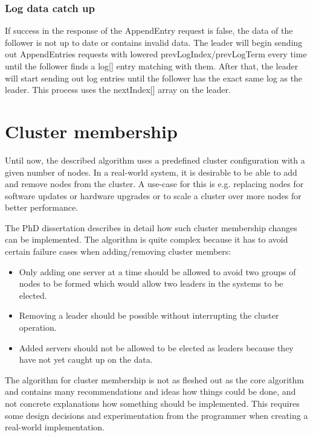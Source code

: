 \subsubsection*{Log data catch up}

If success in the response of the AppendEntry request is false, the data of the follower is not up to date or contains invalid data. The leader will begin sending out AppendEntries requests with lowered prevLogIndex/prevLogTerm every time until the follower finds a log[] entry matching with them. After that, the leader will start sending out log entries until the follower has the exact same log as the leader. This process uses the nextIndex[] array on the leader.





\section{Cluster membership}
Until now, the described algorithm uses a predefined cluster configuration with a given number of nodes. In a real-world system, it is desirable to
be able to add and remove nodes from the cluster. A use-case for this is e.g. replacing nodes for software updates or hardware upgrades or to
scale a cluster over more nodes for better performance.

The PhD dissertation \cite{raft_phd_thesis} describes in detail how such cluster membership changes can be implemented.
The algorithm is quite complex because it has to avoid certain failure cases when adding/removing cluster members:

\begin{itemize}
    \item Only adding one server at a time should be allowed to avoid two groups of nodes to be formed which would allow two leaders in the systems to be elected.
    \item Removing a leader should be possible without interrupting the cluster operation.
    \item Added servers should not be allowed to be elected as leaders because they have not yet caught up on the data.
\end{itemize}

The algorithm for cluster membership is not as fleshed out as the core algorithm and contains many recommendations and ideas how things could be done, and not 
concrete explanations how something should be implemented. This requires some design decisions and experimentation from the programmer when creating a real-world implementation.


